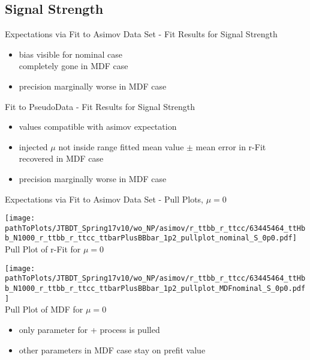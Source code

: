 \subsection{Signal Strength}

\begin{frame}{Expectations via Fit to Asimov Data Set - Fit Results for Signal Strength}

\begin{itemize}
\item bias visible for nominal case\\
\rar completely gone in MDF case
\item precision marginally worse in MDF case
\end{itemize}
\end{frame}


\begin{frame}{Fit to PseudoData - Fit Results for Signal Strength}

\begin{itemize}
\item values compatible with asimov expectation
\item injected $\mu$ not inside range fitted \textcolor{KIT-Lila}{mean value $\pm$ mean error in r-Fit}\\
\rar \textcolor{KIT-Orange}{recovered in MDF case}
\item precision marginally worse in MDF case
\end{itemize}
\end{frame}


\begin{frame}{Expectations via Fit to Asimov Data Set - Pull Plots, $\mu = 0$}

\begin{minipage}{0.44\textwidth}
\centering
\texttt{[image: \\pathToPlots/JTBDT\_Spring17v10/wo\_NP/asimov/r\_ttbb\_r\_ttcc/63445464\_ttHbb\_N1000\_r\_ttbb\_r\_ttcc\_ttbarPlusBBbar\_1p2\_pullplot\_nominal\_S\_0p0.pdf]}\\
\vskip -0.2cm
Pull Plot of r-Fit for $\mu = 0$

\end{minipage}
\hfill
\begin{minipage}{0.44\textwidth}
\centering
\texttt{[image: \\pathToPlots/JTBDT\_Spring17v10/wo\_NP/asimov/r\_ttbb\_r\_ttcc/63445464\_ttHbb\_N1000\_r\_ttbb\_r\_ttcc\_ttbarPlusBBbar\_1p2\_pullplot\_MDFnominal\_S\_0p0.pdf]}\\
\vskip -0.2cm
Pull Plot of MDF for $\mu = 0$

\end{minipage}
\begin{itemize}
\item only parameter for \ttbar + \bbbar process is pulled
\item other parameters in MDF case stay on prefit value
\end{itemize}
\end{frame}

